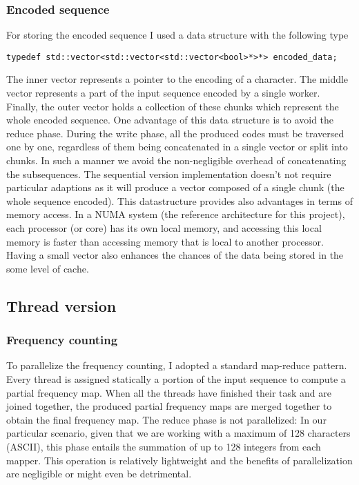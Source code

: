 \documentclass{article}
\begin{document}
\subsubsection{Encoded sequence}
For storing the encoded sequence I used a data structure with the following type

\begin{verbatim}
typedef std::vector<std::vector<std::vector<bool>*>*> encoded_data;
\end{verbatim}

The inner vector represents a
pointer to the encoding of a character. The middle vector
represents a part of the input sequence encoded by a single worker.
Finally, the outer vector holds a collection of these chunks which represent
the whole encoded sequence.
One advantage of this data structure is to avoid the reduce phase.
During the write phase, all the produced codes must be traversed one by one, regardless
of them being concatenated in a single vector or split into chunks. In such a manner we
avoid the non-negligible overhead of concatenating the subsequences.
The sequential version implementation doesn't not require particular adaptions as it
will produce a vector composed of a single chunk (the whole sequence encoded).
This datastructure provides also advantages in terms of memory access.
In a NUMA system (the reference architecture for this project), each processor (or core) has its own local memory,
and accessing this local memory is faster than accessing memory that is local to another processor.
Having a small vector also enhances the chances of the data being stored in the some level of cache.

\subsection{Thread version}
\subsubsection{Frequency counting}
To parallelize the frequency counting, I adopted a standard
map-reduce pattern. Every thread is assigned statically a portion of
the input sequence to compute a partial frequency map.
When all the threads have finished their task and are joined together,
the produced partial frequency maps are merged together to obtain the final
frequency map. The reduce phase is not parallelized:
In our particular scenario, given that we are working with a maximum of 128 characters (ASCII),
this phase entails the summation of up to 128 integers from each mapper.
This operation is relatively lightweight and the benefits of parallelization are negligible
or might even be detrimental.
\end{document}
